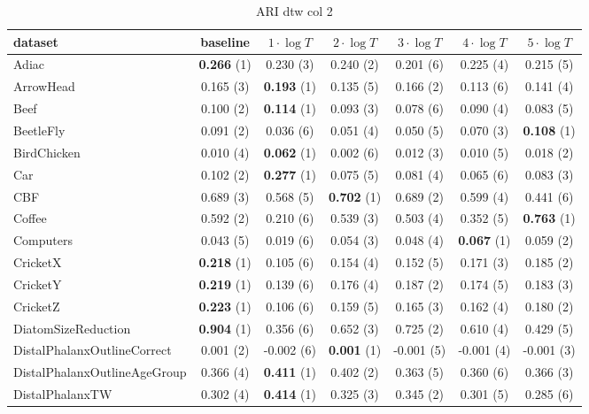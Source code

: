     \begin{table}[ht]
    \caption{ARI dtw col 2} 
    \begin{adjustbox}{width=\textwidth}
    \begin{tabular}{lcccccc}
    \hline
    dataset & baseline & \textbf{$1\cdot \log{T}$} & \textbf{$2\cdot \log{T}$} & \textbf{$3\cdot \log{T}$} & \textbf{$4\cdot \log{T}$} & \textbf{$5\cdot \log{T}$} \\ \hline
    Adiac & \textbf{0.266} (1) & 0.230 (3) & 0.240 (2) & 0.201 (6) & 0.225 (4) & 0.215 (5) \\
    ArrowHead & 0.165 (3) & \textbf{0.193} (1) & 0.135 (5) & 0.166 (2) & 0.113 (6) & 0.141 (4) \\
    Beef & 0.100 (2) & \textbf{0.114} (1) & 0.093 (3) & 0.078 (6) & 0.090 (4) & 0.083 (5) \\
    BeetleFly & 0.091 (2) & 0.036 (6) & 0.051 (4) & 0.050 (5) & 0.070 (3) & \textbf{0.108} (1) \\
    BirdChicken & 0.010 (4) & \textbf{0.062} (1) & 0.002 (6) & 0.012 (3) & 0.010 (5) & 0.018 (2) \\
    Car & 0.102 (2) & \textbf{0.277} (1) & 0.075 (5) & 0.081 (4) & 0.065 (6) & 0.083 (3) \\
    CBF & 0.689 (3) & 0.568 (5) & \textbf{0.702} (1) & 0.689 (2) & 0.599 (4) & 0.441 (6) \\
    Coffee & 0.592 (2) & 0.210 (6) & 0.539 (3) & 0.503 (4) & 0.352 (5) & \textbf{0.763} (1) \\
    Computers & 0.043 (5) & 0.019 (6) & 0.054 (3) & 0.048 (4) & \textbf{0.067} (1) & 0.059 (2) \\
    CricketX & \textbf{0.218} (1) & 0.105 (6) & 0.154 (4) & 0.152 (5) & 0.171 (3) & 0.185 (2) \\
    CricketY & \textbf{0.219} (1) & 0.139 (6) & 0.176 (4) & 0.187 (2) & 0.174 (5) & 0.183 (3) \\
    CricketZ & \textbf{0.223} (1) & 0.106 (6) & 0.159 (5) & 0.165 (3) & 0.162 (4) & 0.180 (2) \\
    DiatomSizeReduction & \textbf{0.904} (1) & 0.356 (6) & 0.652 (3) & 0.725 (2) & 0.610 (4) & 0.429 (5) \\
    DistalPhalanxOutlineCorrect & 0.001 (2) & -0.002 (6) & \textbf{0.001} (1) & -0.001 (5) & -0.001 (4) & -0.001 (3) \\
    DistalPhalanxOutlineAgeGroup & 0.366 (4) & \textbf{0.411} (1) & 0.402 (2) & 0.363 (5) & 0.360 (6) & 0.366 (3) \\
    DistalPhalanxTW & 0.302 (4) & \textbf{0.414} (1) & 0.325 (3) & 0.345 (2) & 0.301 (5) & 0.285 (6) \\

\end{tabular}
\end{adjustbox}
\end{table}

